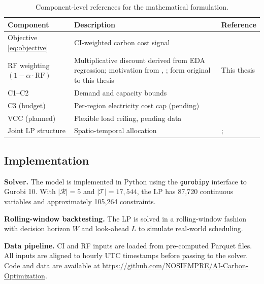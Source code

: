 \begin{table}[h]
\centering
\begin{tabularx}{\linewidth}{p{3.6cm}Xp{4cm}}
\toprule
\textbf{Component} & \textbf{Description} & \textbf{Reference} \\
\midrule
Objective \eqref{eq:objective}     & CI-weighted carbon cost signal          & \citet{radovanovic2023} \\
RF weighting $(1-\alpha\cdot\mathrm{RF})$ & Multiplicative discount derived from EDA regression; motivation from \citet{radovanovic2023}, \citet{liu2012}; form original to this thesis & This thesis \\
C1--C2                             & Demand and capacity bounds              & \citet{liu2012} \\
C3 (budget)                        & Per-region electricity cost cap (pending) & \citet{hao2024joint} \\
VCC (planned)                      & Flexible load ceiling, pending data     & \citet{colangelo2025} \\
Joint LP structure                 & Spatio-temporal allocation              & \citet{riepin2024spatiotemporal}; \citet{attenni2024shifting} \\
\bottomrule
\end{tabularx}
\caption{Component-level references for the mathematical formulation.}
\label{tab:modelrefs}
\end{table}

\subsection{Implementation}

\textbf{Solver.}
The model is implemented in Python using the \texttt{gurobipy} interface to Gurobi 10.
With $|\mathcal{R}|=5$ and $|\mathcal{T}|=17{,}544$, the LP has 87,720 continuous variables and approximately 105,264 constraints.

\textbf{Rolling-window backtesting.}
The LP is solved in a rolling-window fashion with decision horizon $W$ and look-ahead $L$ to simulate real-world scheduling.

\textbf{Data pipeline.}
CI and RF inputs are loaded from pre-computed Parquet files.
All inputs are aligned to hourly UTC timestamps before passing to the solver.
Code and data are available at \url{https://github.com/NOSIEMPRE/AI-Carbon-Optimization}.

